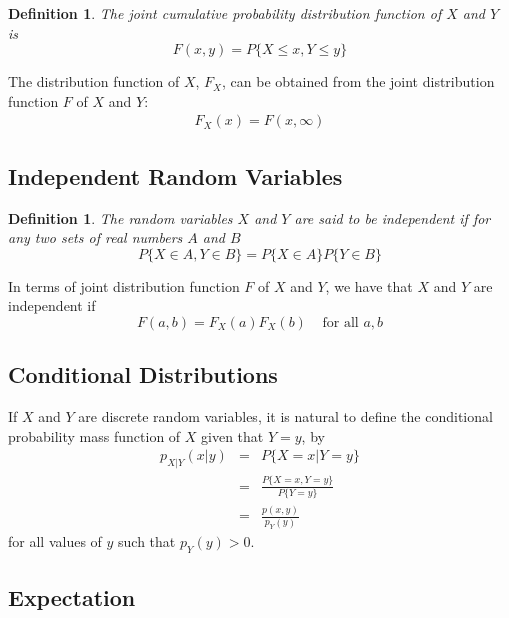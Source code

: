 \documentclass[12pt]{article}
\newtheorem{definition}[theorem]{Definition}
\begin{document}
\begin{definition}
  The joint cumulative probability distribution function of $X$ and $Y$ is
  \begin{equation*}
    F(x,y) = P\{ X \le x, Y \le y \}
  \end{equation*}
\end{definition}

The distribution function of $X$, $F_X$, can be obtained from the joint distribution function $F$ of $X$ and $Y$:
\begin{eqnarray*}
  F_X(x) = F(x, \infty)
\end{eqnarray*}

\subsection{Independent Random Variables}

\begin{definition}
  The random variables $X$ and $Y$ are said to be independent if for any two sets of real numbers $A$ and $B$
  \begin{equation*}
    P \{ X \in A, Y \in B \} = P\{ X \in A \} P\{ Y \in B \}
  \end{equation*}
\end{definition}

In terms of joint distribution function $F$ of $X$ and $Y$, we have that $X$ and $Y$ are independent if
\begin{equation*}
  F(a,b) = F_X(a)F_X(b) \;\;\;\; \text{for all } a,b
\end{equation*}

\subsection{Conditional Distributions}

If $X$ and $Y$ are discrete random variables, it is natural to define the conditional probability mass function of $X$ given that $Y=y$, by
\begin{eqnarray*}
  p_{X|Y}(x|y)
  &=& P\{ X = x | Y = y \} \\
  &=& \frac {P\{ X = x, Y = y \}}{P\{ Y = y \}} \\
  &=& \frac {p(x,y)}{p_Y(y)}
\end{eqnarray*}
for all values of $y$ such that $p_Y(y) > 0$.

\subsection{Expectation}
\end{document}
